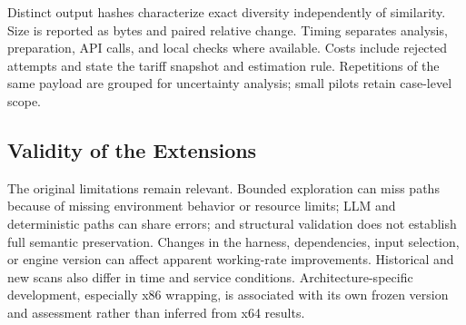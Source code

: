 Distinct output hashes characterize exact diversity independently of
similarity. Size is reported as bytes and paired relative change.
Timing separates analysis, preparation, API calls, and local checks
where available. Costs include rejected attempts and state the tariff
snapshot and estimation rule. Repetitions of the same payload are
grouped for uncertainty analysis; small pilots retain case-level scope.

\subsection{Validity of the Extensions}\label{sec:extension_limits}
The original limitations remain relevant. Bounded exploration can
miss paths because of missing environment behavior or resource limits;
LLM and deterministic paths can share errors; and structural validation
does not establish full semantic preservation. Changes in the harness,
dependencies, input selection, or engine version can affect apparent
working-rate improvements. Historical and new scans also differ in
time and service conditions. Architecture-specific development,
especially x86 wrapping, is associated with its own frozen version
and assessment rather than inferred from x64 results.

